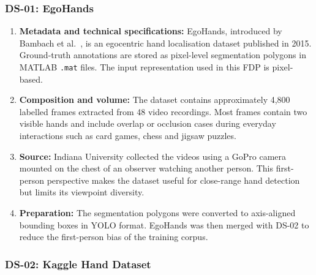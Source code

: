 \subsubsection*{DS-01: EgoHands}

\begin{enumerate}
    \item \textbf{Metadata and technical specifications:} EgoHands, introduced by Bambach et al.~\cite{bambach2015egohands}, is an egocentric hand
          localisation dataset published in 2015. Ground-truth annotations are stored as pixel-level
          segmentation polygons in MATLAB \texttt{.mat} files. The input representation used in this FDP is
          pixel-based.

    \item \textbf{Composition and volume:} The dataset contains approximately 4,800 labelled frames extracted from 48 video recordings. Most
          frames contain two visible hands and include overlap or occlusion cases during everyday
          interactions such as card games, chess and jigsaw puzzles.

    \item \textbf{Source:} Indiana University collected the videos using a GoPro camera mounted on the chest of an observer
          watching another person. This first-person perspective makes the dataset useful for close-range
          hand detection but limits its viewpoint diversity.

    \item \textbf{Preparation:} The segmentation polygons were converted to axis-aligned bounding boxes in YOLO format. EgoHands
          was then merged with DS-02 to reduce the first-person bias of the training corpus.

\end{enumerate}

\subsubsection*{DS-02: Kaggle Hand Dataset}

